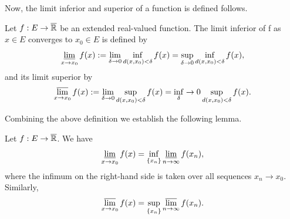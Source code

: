     Now, the limit inferior and superior of a function is defined follows.
    \begin{definition}
        Let $f : E \to \overline{\mathbb{R}} $ be an extended real-valued function. The limit
        inferior of f as $x \in E$ converges to $x_0 \in E$  is defined by 
        $$
            \varliminf_{x \to x_0} f(x) := \lim_{\delta \to 0} %
            \inf_{d(x, x_0) < \delta} f(x) = \sup_{\delta\to 0 }\inf_{d(x, x_0) %
            < \delta} f(x),
        $$
        and its limit superior by 
        $$
            \varlimsup_{x \to x_0} f(x) := \lim_{\delta \to 0} %
            \sup_{d(x, x_0) < \delta} f(x) = \inf_{\delta} \to 0 \sup_{d(x, x_0) %
            < \delta} f(x).
        $$
    \end{definition}
    Combining the above definition we establish the following lemma. 
    \begin{lemma}\label{c1s5L1}
        Let $f : E \to \overline{\mathbb{R}} $. We have
        $$
            \varliminf_{x \to x_0} f(x) = \inf_{\{x_n\}}{\varliminf_{n \to \infty}f(x_n)},
        $$
        where the infimum on the right-hand side is taken over all sequences 
        $x_n \to x_0$. Similarly, 
        $$
            \varlimsup_{x \to x_0} f(x) = \sup_{\{x_n\}}{\varlimsup_{n \to \infty}f(x_n)}.
        $$
    \end{lemma}
